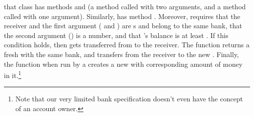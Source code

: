  that class 
 has  methods  and 
  (\ie a method called 
with two arguments, and a method called 
with one argument). Similarly,  has method  .
Moreover,  requires that  the receiver and the
first argument  ( and ) are s
and belong to the same bank,
that the second argument () is a number, and that 's
balance is at least .
If this condition  holds, then %
  gets transferred from  to the receiver.
 The function   returns a fresh  with the same bank, and transfers 
 from the receiver  to the new .
 Finally, the function  when run by a  creates a new  with corresponding 
 amount of money in it.\footnote{{Note that our very limited bank specification doesn't even have the concept of an account owner.}}
%
